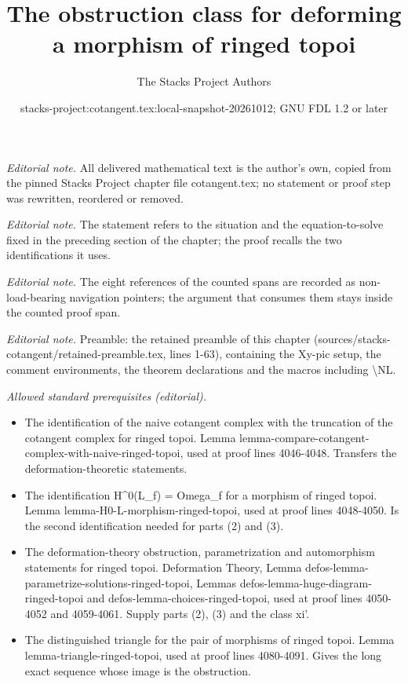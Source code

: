 \documentclass[10pt,a4paper]{amsart}
\title{The obstruction class for deforming a morphism of ringed topoi}
\author{The Stacks Project Authors}
\date{stacks-project:cotangent.tex:local-snapshot-20261012; GNU FDL 1.2 or later}
\theoremstyle{plain}
\theoremstyle{definition}
\theoremstyle{remark}
\numberwithin{equation}{subsection}
\begin{document}
\maketitle
\setcounter{subsection}{1}
\noindent\textit{Editorial note.} All delivered mathematical text is the author's own, copied from the pinned Stacks Project chapter file cotangent.tex; no statement or proof step was rewritten, reordered or removed.\par\medskip
\noindent\textit{Editorial note.} The statement refers to the situation and the equation-to-solve fixed in the preceding section of the chapter; the proof recalls the two identifications it uses.\par\medskip
\noindent\textit{Editorial note.} The eight references of the counted spans are recorded as non-load-bearing navigation pointers; the argument that consumes them stays inside the counted proof span.\par\medskip
\noindent\textit{Editorial note.} Preamble: the retained preamble of this chapter (sources/stacks-cotangent/retained-preamble.tex, lines 1-63), containing the Xy-pic setup, the comment environments, the theorem declarations and the macros including \textbackslash{}NL.\par\medskip
\noindent\textit{Allowed standard prerequisites (editorial).}\begin{itemize}
\item The identification of the naive cotangent complex with the truncation of the cotangent complex for ringed topoi. Lemma lemma-compare-cotangent-complex-with-naive-ringed-topoi, used at proof lines 4046-4048. Transfers the deformation-theoretic statements.
\item The identification H\textasciicircum{}0(L\_f) = Omega\_f for a morphism of ringed topoi. Lemma lemma-H0-L-morphism-ringed-topoi, used at proof lines 4048-4050. Is the second identification needed for parts (2) and (3).
\item The deformation-theory obstruction, parametrization and automorphism statements for ringed topoi. Deformation Theory, Lemma defos-lemma-parametrize-solutions-ringed-topoi, Lemmas defos-lemma-huge-diagram-ringed-topoi and defos-lemma-choices-ringed-topoi, used at proof lines 4050-4052 and 4059-4061. Supply parts (2), (3) and the class xi'.
\item The distinguished triangle for the pair of morphisms of ringed topoi. Lemma lemma-triangle-ringed-topoi, used at proof lines 4080-4091. Gives the long exact sequence whose image is the obstruction.
\end{itemize}\medskip
\end{document}
